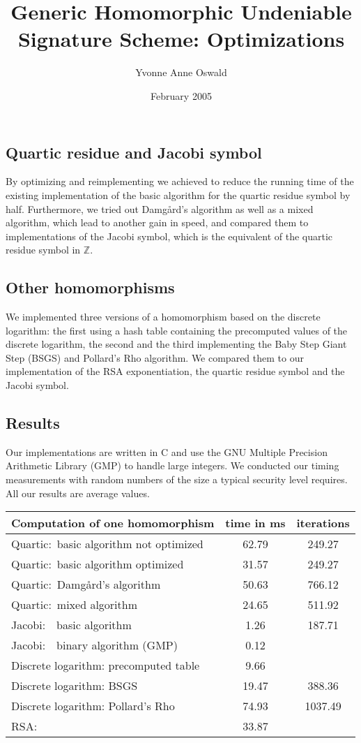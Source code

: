 \documentclass[footer]{lasecposter}
\title{Generic Homomorphic Undeniable Signature Scheme: Optimizations}
\author{Yvonne Anne Oswald}
\date{February 2005}
\begin{document}
\maketitle %
\begin{multicols}{2}

\subsection*{\sffamily Quartic residue and Jacobi symbol}
By optimizing and reimplementing we achieved to reduce the running time of the existing implementation of the basic algorithm for the quartic residue symbol by half. Furthermore, we tried out Damg\aa rd's algorithm as well as a mixed algorithm, which lead to another gain in speed, and compared them to implementations of the Jacobi symbol, which is the equivalent of the quartic residue symbol in $\mathbb{Z}$.
 
 
  \subsection*{\sffamily Other homomorphisms}
We implemented three versions of a homomorphism based on the discrete logarithm: the first using a hash table containing the precomputed values of the discrete logarithm, the second and the third implementing the Baby Step Giant Step (BSGS) and Pollard's Rho algorithm. We compared them to our implementation of the RSA exponentiation, the quartic residue symbol and the Jacobi symbol.  
\end{multicols}

\subsection*{\sffamily Results}
Our implementations are written in C and use the GNU Multiple Precision Arithmetic Library (GMP) to handle large integers. We conducted our timing measurements with  random numbers of the size a typical security level requires. All our results are average values.
 \begin{table}[htb] 
 \centering
 \sffamily 
 \begin{tabular}{|l c c|} 
 \hline 
Computation of one homomorphism &  {time in ms} &  {iterations}\\ 
 \hline  
 Quartic:~basic algorithm not optimized & 62.79 & 249.27\\
 Quartic:~basic algorithm optimized & 31.57 & 249.27\\
 Quartic:~Damg\aa rd's algorithm  &  50.63 & 766.12\\
 Quartic:~mixed algorithm & 24.65 & 511.92\\ 
 Jacobi:~~basic algorithm & 1.26 & 187.71\\
 Jacobi:~~binary algorithm (GMP) & 0.12 & \\
 Discrete logarithm: precomputed table & 9.66 & \\ 
 Discrete logarithm: BSGS& 19.47 & 388.36\\ 
 Discrete logarithm: Pollard's Rho& 74.93 & 1037.49\\ 
 RSA: & 33.87 & \\
 \hline 
 \end{tabular}
 \end{table}
\end{document}
